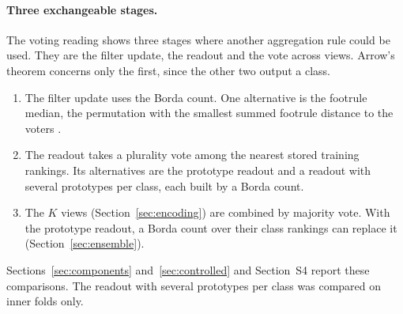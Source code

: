 \paragraph{Three exchangeable stages.}
The voting reading shows three stages where another aggregation rule could be used. They are the filter update, the readout and the vote across views. Arrow's theorem concerns only the first, since the other two output a class.
\begin{enumerate}[leftmargin=2em,topsep=2pt,itemsep=1pt]
  \item The filter update uses the Borda count. One alternative is the footrule median, the permutation with the smallest summed footrule distance to the voters \citep{dwork2001rank}.
  \item The readout takes a plurality vote among the nearest stored training rankings. Its alternatives are the prototype readout and a readout with several prototypes per class, each built by a Borda count.
  \item The $K$ views (Section~\ref{sec:encoding}) are combined by majority vote. With the prototype readout, a Borda count over their class rankings can replace it (Section~\ref{sec:ensemble}).
\end{enumerate}
Sections~\ref{sec:components} and~\ref{sec:controlled} and Section~S4 report these comparisons. The readout with several prototypes per class was compared on inner folds only.
